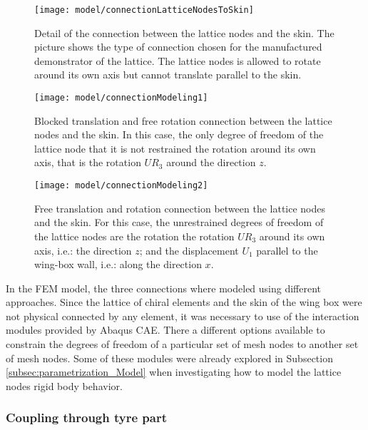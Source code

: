 \begin{figure}[!htpb]
  \centering
  \texttt{[image: model/connectionLatticeNodesToSkin]}
  \caption[Detail of the connection between the lattice nodes and the skin]{Detail of the connection between the lattice nodes and the skin. The picture shows the type of connection chosen for the manufactured demonstrator of the lattice. The lattice nodes is allowed to rotate around its own axis but cannot translate parallel to the skin. \cite{Vincenz2017}}\label{fig:connectionLatticeNodesToSkin}
\end{figure}

\begin{figure}[!htpb]
  \centering
  \texttt{[image: model/connectionModeling1]}
  \caption[Blocked translation and free rotation connection between the lattice nodes and the skin]{Blocked translation and free rotation connection between the lattice nodes and the skin. In this case, the only degree of freedom of the lattice node that it is not restrained the rotation around its own axis, that is the rotation $UR_3$ around the direction $z$.}\label{fig:connectionModeling1}
\end{figure}

\begin{figure}[!htpb]
  \centering
  \texttt{[image: model/connectionModeling2]}
  \caption[Free translation and rotation connection between the lattice nodes and the skin]{Free translation and rotation connection between the lattice nodes and the skin. For this case, the unrestrained degrees of freedom of the lattice nodes are the rotation the rotation $UR_3$ around its own axis, i.e.: the direction $z$; and the displacement $U_1$ parallel to the wing-box wall, i.e.: along the direction $x$.}\label{fig:connectionModeling2}
\end{figure}

In the FEM model, the three connections where modeled using different approaches. Since the lattice of chiral elements and the skin of the wing box were not physical connected by any element, it was necessary to use of the interaction modules provided by Abaqus CAE. There a different options available to constrain the degrees of freedom of a particular set of mesh nodes to another set of mesh nodes. Some of these modules were already explored in Subsection \ref{subsec:parametrization_Model} when investigating how to model the lattice nodes rigid body behavior.

\subsubsection{Coupling through tyre part}

